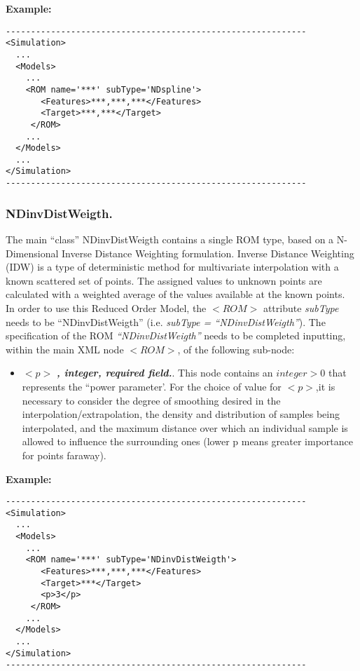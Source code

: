 \textbf{Example:}
\begin{lstlisting}[style=XML]
------------------------------------------------------------
<Simulation>
  ...
  <Models>
    ...
    <ROM name='***' subType='NDspline'>
       <Features>***,***,***</Features> 
       <Target>***,***</Target>
     </ROM>
    ...
  </Models>
  ...
</Simulation>
------------------------------------------------------------
\end{lstlisting}
\subsubsection{NDinvDistWeigth.}
\label{subsubsec:NDinvDistWeigth}
The main ``class'' NDinvDistWeigth contains a single ROM type, based on a N-Dimensional Inverse Distance Weighting formulation. Inverse Distance Weighting (IDW) is a type of deterministic method for multivariate interpolation with a known scattered set of points. The assigned values to unknown points are calculated with a weighted average of the values available at the known points. 
\\In order to use this Reduced Order Model, the $<ROM>$ attribute \textit{subType} needs to be ``NDinvDistWeigth'' (i.e. \textit{subType = ``NDinvDistWeigth''}). The specification of the ROM \textit{``NDinvDistWeigth''} needs to be completed inputting, within the main XML node $<ROM>$, of the following sub-node:
\begin{itemize}
\item $<p>$ \textbf{\textit{, integer, required field.}}. This node contains an $integer > 0$ that represents the ``power parameter'. For the choice of value for $<p>$,it is necessary to consider the degree of smoothing desired in the interpolation/extrapolation, the density and distribution of samples being interpolated, and the maximum distance over which an individual sample is allowed to influence the surrounding ones (lower p means greater importance for points faraway).
\end{itemize}

\textbf{Example:}
\begin{lstlisting}[style=XML]
------------------------------------------------------------
<Simulation>
  ...
  <Models>
    ...
    <ROM name='***' subType='NDinvDistWeigth'>
       <Features>***,***,***</Features> 
       <Target>***</Target>
       <p>3</p>
     </ROM>
    ...
  </Models>
  ...
</Simulation>
------------------------------------------------------------
\end{lstlisting}
